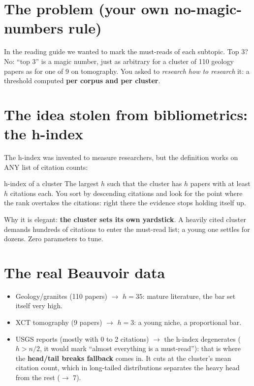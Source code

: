 \documentclass[11pt,a4paper]{article}
\begin{document}
\section{The problem (your own no-magic-numbers rule)}

In the reading guide we wanted to mark the must-reads of each subtopic. Top 3? No: ``top 3''
is a magic number, just as arbitrary for a cluster of 110 geology papers as for one of 9 on
tomography. You asked to \emph{research how to research} it: a threshold computed \textbf{per
corpus and per cluster}.

\section{The idea stolen from bibliometrics: the h-index}

The h-index was invented to measure researchers, but the definition works on ANY list of
citation counts:

\begin{concepto}{h-index of a cluster}
The largest $h$ such that the cluster has $h$ papers with at least $h$ citations each. You sort
by descending citations and look for the point where the rank overtakes the citations: right
there the evidence stops holding itself up.
\end{concepto}

Why it is elegant: \textbf{the cluster sets its own yardstick}. A heavily cited cluster demands
hundreds of citations to enter the must-read list; a young one settles for dozens. Zero
parameters to tune.

\section{The real Beauvoir data}

\begin{itemize}
  \item Geology/granites (110 papers) $\rightarrow$ $h = 35$: mature literature, the bar set
        itself very high.
  \item XCT tomography (9 papers) $\rightarrow$ $h = 3$: a young niche, a proportional bar.
  \item USGS reports (mostly with 0 to 2 citations) $\rightarrow$ the h-index degenerates
        ($h > n/2$, it would mark ``almost everything is a must-read''): that is where the
        \textbf{head/tail breaks fallback} comes in. It cuts at the cluster's mean citation
        count, which in long-tailed distributions separates the heavy head from the rest
        ($\rightarrow$ 7).
\end{itemize}
\end{document}
